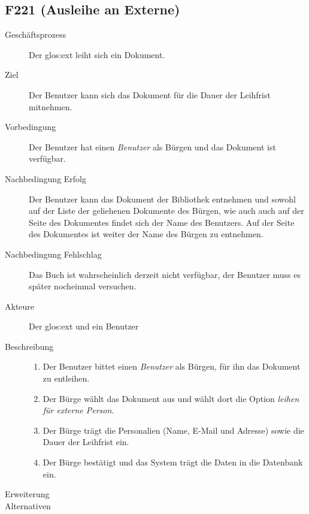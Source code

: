 \subsection{F221 (Ausleihe an Externe)}
\begin{description}
  \item[Geschäftsprozess]Der \gls{glos:ext} leiht sich ein Dokument.
  \item[Ziel]Der Benutzer kann sich das Dokument für die Dauer der Leihfrist mitnehmen.
  \item[Vorbedingung]Der Benutzer hat einen \emph{Benutzer} als Bürgen und das Dokument ist verfügbar.
  \item[Nachbedingung Erfolg]Der Benutzer kann das Dokument der Bibliothek entnehmen und sowohl auf der Liste der geliehenen Dokumente des Bürgen, wie auch auch auf der Seite des Dokumentes findet sich der Name des  Benutzers. Auf der Seite des Dokumentes ist weiter der Name des Bürgen zu entnehmen.
  \item[Nachbedingung Fehlschlag]Das Buch ist wahrscheinlich derzeit nicht verfügbar, der Benutzer muss es später nocheinmal versuchen.
  \item[Akteure]Der \gls{glos:ext} und ein Benutzer 
  \item[Beschreibung]\hfill
    \begin{enumerate}
      \item Der Benutzer bittet einen \emph{Benutzer} als Bürgen, für ihn das Dokument zu entleihen.
      \item Der Bürge wählt das Dokument aus und wählt dort die Option \emph{leihen für externe Person}.
      \item Der Bürge trägt die Personalien (Name, E-Mail und Adresse) sowie die Dauer der Leihfrist ein.
      \item Der Bürge bestätigt und das System trägt die Daten in die Datenbank ein.
    \end{enumerate}
  \item[Erweiterung]
  \item[Alternativen]
\end{description}

